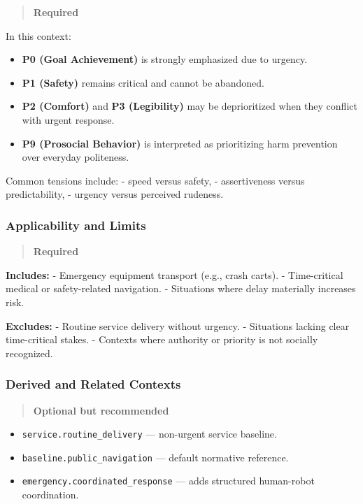 \documentclass[utf8]{frontiers_suppmat} %
\providecommand{\tightlist}{%
  \setlength{\itemsep}{0pt}\setlength{\parskip}{0pt}}
\begin{document}
\begin{quote}
\textbf{Required}
\end{quote}

In this context:

\begin{itemize}
\tightlist
\item
  \textbf{P0 (Goal Achievement)} is strongly emphasized due to urgency.
\item
  \textbf{P1 (Safety)} remains critical and cannot be abandoned.
\item
  \textbf{P2 (Comfort)} and \textbf{P3 (Legibility)} may be
  deprioritized when they conflict with urgent response.
\item
  \textbf{P9 (Prosocial Behavior)} is interpreted as prioritizing harm
  prevention over everyday politeness.
\end{itemize}

Common tensions include: - speed versus safety, - assertiveness versus
predictability, - urgency versus perceived rudeness.

\subsubsection{Applicability and Limits}\label{applicability-and-limits}

\begin{quote}
\textbf{Required}
\end{quote}

\textbf{Includes:} - Emergency equipment transport (e.g., crash carts).
- Time-critical medical or safety-related navigation. - Situations where
delay materially increases risk.

\textbf{Excludes:} - Routine service delivery without urgency. -
Situations lacking clear time-critical stakes. - Contexts where
authority or priority is not socially recognized.

\subsubsection{Derived and Related
Contexts}\label{derived-and-related-contexts}

\begin{quote}
\textbf{Optional but recommended}
\end{quote}

\begin{itemize}
\tightlist
\item
  \texttt{service.routine\_delivery} --- non-urgent service baseline.
\item
  \texttt{baseline.public\_navigation} --- default normative reference.
\item
  \texttt{emergency.coordinated\_response} --- adds structured
  human-robot coordination.
\end{itemize}
\end{document}
